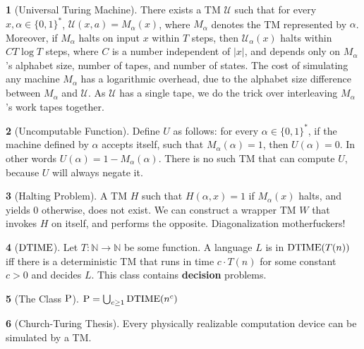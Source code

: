 \documentclass[10pt]{article}
\theoremstyle{definition}
\newtheorem{note}{}[section]
\begin{document}
\begin{note}[Universal Turing Machine]
  There exists a TM $\mathcal{U}$ such that for every
  $x, \alpha \in \{0, 1\}^\ast$, $\mathcal{U}(x, a) = M_\alpha (x)$, where
  $M_\alpha$ denotes the TM represented by $\alpha$.
  Moreover, if $M_\alpha$ halts on input $x$ within $T$ steps, then
  $\mathcal{U}_\alpha (x)$ halts within $C T \log T$ steps, where $C$ is
  a number independent of $|x|$, and depends only on $M_\alpha$'s alphabet
  size, number of tapes, and number of states.
  The cost of simulating any machine $M_\alpha$ has a
  logarithmic overhead, due to the alphabet size difference between
  $M_\alpha$ and $\mathcal{U}$.
  As $\mathcal{U}$ has a single tape, we do the trick over interleaving
  $M_\alpha$'s work tapes together.
\end{note}

\begin{note}[Uncomputable Function]
  Define $U$ as follows: for every $\alpha \in \{0, 1\}^\ast$, if the machine
  defined by $\alpha$ accepts itself, such that $M_\alpha (\alpha) = 1$, then
  $U(\alpha) = 0$.
  In other words $U(\alpha) = 1 - M_\alpha (\alpha)$.
  There is no such TM that can compute $U$, because $U$ will always negate it.
\end{note}

\begin{note}[Halting Problem]
  A TM $H$ such that $H(\alpha, x) = 1$ if $M_\alpha (x)$ halts, and yields
  $0$ otherwise, does not exist.
  We can construct a wrapper TM $W$ that invokes $H$ on itself, and performs
  the opposite.
  Diagonalization motherfuckers!
\end{note}

\begin{note}[$\mathrm{DTIME}$]
  Let $T : \mathbb{N} \to \mathbb{N}$ be some function.
  A language $L$ is in $\mathrm{DTIME}(T(n))$ iff there is a deterministic
  TM that runs in time
  $c \cdot T(n)$ for some constant $c > 0$ and decides $L$.
  This class contains \textbf{decision} problems.
\end{note}

\begin{note}[The Class $\mathrm{P}$]
  $\mathrm{P} = \bigcup_{c \geq 1} \mathrm{DTIME}(n^c)$
\end{note}

\begin{note}[Church-Turing Thesis]
  Every physically realizable computation device can be simulated by a TM.
\end{note}
\end{document}
